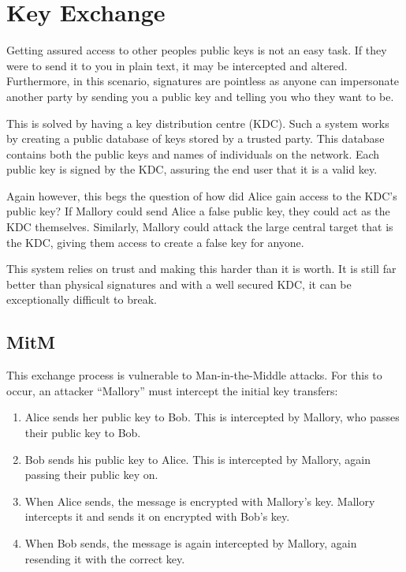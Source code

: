 	\section{Key Exchange}
		Getting assured access to other peoples public keys is not an easy task. 
		If they were to send it to you in plain text, it may be intercepted and altered. 
		Furthermore, in this scenario, signatures are pointless as anyone can impersonate another party by sending you a public key and telling you who they want to be. 

		This is solved by having a key distribution centre (KDC). 
		Such a system works by creating a public database of keys stored by a trusted party.
		This database contains both the public keys and names of individuals on the network. 
		Each public key is signed by the KDC, assuring the end user that it is a valid key. 

		Again however, this begs the question of how did Alice gain access to the KDC's public key?
		If Mallory could send Alice a false public key, they could act as the KDC themselves. 
		Similarly, Mallory could attack the large central target that is the KDC, giving them access to create a false key for anyone. 

		This system relies on trust and making this harder than it is worth. 
		It is still far better than physical signatures and with a well secured KDC, it can be exceptionally difficult to break. 

		\subsection{MitM}
			This exchange process is vulnerable to Man-in-the-Middle attacks. 
			For this to occur, an attacker ``Mallory'' must intercept the initial key transfers:
			\begin{enumerate}
				\item Alice sends her public key to Bob. This is intercepted by Mallory, who passes their public key to Bob. 
				\item Bob sends his public key to Alice. This is intercepted by Mallory, again passing their public key on. 
				\item When Alice sends, the message is encrypted with Mallory's key. 
					Mallory intercepts it and sends it on encrypted with Bob's key. 
				\item When Bob sends, the message is again intercepted by Mallory, again resending it with the correct key. 
			\end{enumerate}

